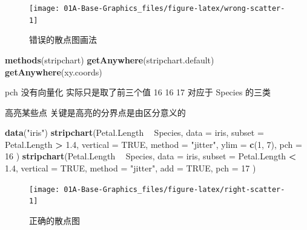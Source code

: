 \documentclass[a4paper,oneside,UTF8]{book}
\newenvironment{Shaded}{\begin{snugshade}}{\end{snugshade}}
\newcommand{\DataTypeTok}[1]{\textcolor[rgb]{0.13,0.29,0.53}{#1}}
\newcommand{\DecValTok}[1]{\textcolor[rgb]{0.00,0.00,0.81}{#1}}
\newcommand{\FloatTok}[1]{\textcolor[rgb]{0.00,0.00,0.81}{#1}}
\newcommand{\KeywordTok}[1]{\textcolor[rgb]{0.13,0.29,0.53}{\textbf{#1}}}
\newcommand{\NormalTok}[1]{#1}
\newcommand{\OperatorTok}[1]{\textcolor[rgb]{0.81,0.36,0.00}{\textbf{#1}}}
\newcommand{\OtherTok}[1]{\textcolor[rgb]{0.56,0.35,0.01}{#1}}
\newcommand{\StringTok}[1]{\textcolor[rgb]{0.31,0.60,0.02}{#1}}
\begin{document}
\begin{figure}

{\centering \texttt{[image: 01A-Base-Graphics\_files/figure-latex/wrong-scatter-1]} 

}

\caption{错误的散点图画法}\label{fig:wrong-scatter}
\end{figure}

\begin{Shaded}
\begin{Highlighting}[]
\KeywordTok{methods}\NormalTok{(stripchart)}
\KeywordTok{getAnywhere}\NormalTok{(stripchart.default)}
\KeywordTok{getAnywhere}\NormalTok{(xy.coords)}
\end{Highlighting}
\end{Shaded}

pch 没有向量化 实际只是取了前三个值 16 16 17 对应于 Species 的三类

高亮某些点 关键是高亮的分界点是由区分意义的

\begin{Shaded}
\begin{Highlighting}[]
\KeywordTok{data}\NormalTok{(}\StringTok{"iris"}\NormalTok{)}
\KeywordTok{stripchart}\NormalTok{(Petal.Length }\OperatorTok{~}\StringTok{ }\NormalTok{Species,}
  \DataTypeTok{data =}\NormalTok{ iris, }\DataTypeTok{subset =}\NormalTok{ Petal.Length }\OperatorTok{>}\StringTok{ }\FloatTok{1.4}\NormalTok{,}
  \DataTypeTok{vertical =} \OtherTok{TRUE}\NormalTok{, }\DataTypeTok{method =} \StringTok{"jitter"}\NormalTok{, }\DataTypeTok{ylim =} \KeywordTok{c}\NormalTok{(}\DecValTok{1}\NormalTok{, }\DecValTok{7}\NormalTok{),}
  \DataTypeTok{pch =} \DecValTok{16}
\NormalTok{)}
\KeywordTok{stripchart}\NormalTok{(Petal.Length }\OperatorTok{~}\StringTok{ }\NormalTok{Species,}
  \DataTypeTok{data =}\NormalTok{ iris, }\DataTypeTok{subset =}\NormalTok{ Petal.Length }\OperatorTok{<}\StringTok{ }\FloatTok{1.4}\NormalTok{,}
  \DataTypeTok{vertical =} \OtherTok{TRUE}\NormalTok{, }\DataTypeTok{method =} \StringTok{"jitter"}\NormalTok{, }\DataTypeTok{add =} \OtherTok{TRUE}\NormalTok{,}
  \DataTypeTok{pch =} \DecValTok{17}
\NormalTok{)}
\end{Highlighting}
\end{Shaded}

\begin{figure}

{\centering \texttt{[image: 01A-Base-Graphics\_files/figure-latex/right-scatter-1]} 

}

\caption{正确的散点图}\label{fig:right-scatter}
\end{figure}
\end{document}
